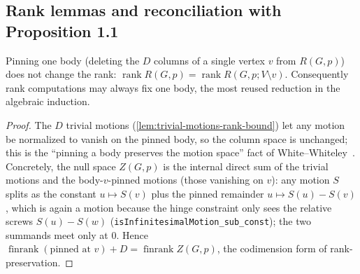 \subsection{Rank lemmas and reconciliation with Proposition 1.1}
\label{sec:molecular-rigidity-matrix-rank}

\begin{lemma}
  \label{lem:rank-delete-vertex}
  \leanok
  Pinning one body (deleting the $D$ columns of a single vertex $v$ from
  $R(G,p)$) does not change the rank:
  $\operatorname{rank} R(G,p) = \operatorname{rank} R(G,p; V \setminus v)$.
  Consequently rank computations may always fix one body, the most
  reused reduction in the algebraic induction.
\end{lemma}
\begin{proof}
  \leanok
  The $D$ trivial motions (\cref{lem:trivial-motions-rank-bound}) let
  any motion be normalized to vanish on the pinned body, so the column
  space is unchanged; this is the ``pinning a body preserves the motion
  space'' fact of White--Whiteley~\cite{whiteWhiteley1987}. Concretely,
  the null space $Z(G,p)$ is the internal direct sum of the trivial
  motions and the body-$v$-pinned motions (those vanishing on $v$): any
  motion $S$ splits as the constant $u \mapsto S(v)$ plus the pinned
  remainder $u \mapsto S(u) - S(v)$, which is again a motion because the
  hinge constraint only sees the relative screws $S(u) - S(w)$
  (\texttt{isInfinitesimalMotion\_sub\_const}); the two summands meet only
  at $0$. Hence $\operatorname{finrank}(\text{pinned at } v) + D =
  \operatorname{finrank} Z(G,p)$, the codimension form of
  rank-preservation.
\end{proof}


